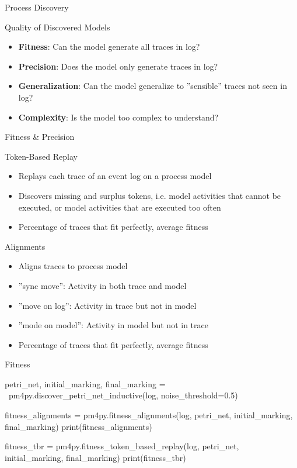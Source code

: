 \documentclass[ignorenonframetext,xcolor=x11names]{beamer}
\begin{document}
\begin{frame}{Process Discovery}
\begin{block}{Quality of Discovered Models}
\begin{itemize}
   \item \textbf{Fitness}: Can the model generate all traces in log?
   \item \textbf{Precision}: Does the model only generate traces in log?
   \item \textbf{Generalization}: Can the model generalize to ''sensible'' traces not seen in log?
   \item \textbf{Complexity}: Is the model too complex to understand?
\end{itemize}
\end{block}
\end{frame}

\begin{frame}{Fitness \& Precision}
\begin{block}{Token-Based Replay}
\begin{itemize}
   \item Replays each trace of an event log on a process model
   \item Discovers missing and surplus tokens, i.e. model activities that cannot be executed, or model activities that are executed too often
   \item Percentage of traces that fit perfectly, average fitness
\end{itemize}
\end{block}
\begin{block}{Alignments}
\begin{itemize}
    \item Aligns traces to process model
    \item ''sync move'': Activity in both trace and model
    \item ''move on log'': Activity in trace but not in model
    \item ''mode on model'': Activity in model but not in trace
    \item Percentage of traces that fit perfectly, average fitness
\end{itemize}
\end{block}
\end{frame}

\begin{frame}[fragile]{Fitness}
\footnotesize
\begin{pythoncode}
petri_net, initial_marking, final_marking = \
    pm4py.discover_petri_net_inductive(log, 
        noise_threshold=0.5)

fitness_alignments = pm4py.fitness_alignments(log,
    petri_net, initial_marking, final_marking)
print(fitness_alignments)

fitness_tbr = pm4py.fitness_token_based_replay(log, 
    petri_net, initial_marking, final_marking)
print(fitness_tbr)
\end{pythoncode}
\end{frame}
\end{document}

